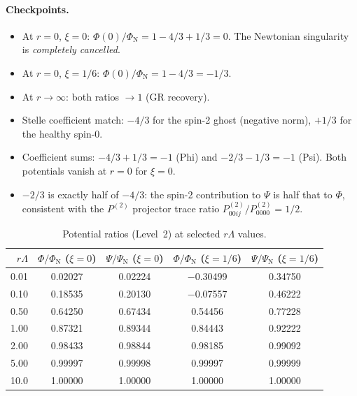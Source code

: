 \documentclass[11pt,a4paper]{article}
\begin{document}
\paragraph{Checkpoints.}
\begin{itemize}
  \item At $r = 0$, $\xi = 0$:
    $\Phi(0)/\Phi_{\mathrm{N}} = 1 - 4/3 + 1/3 = 0$.
    The Newtonian singularity is \emph{completely cancelled}.
    \quad\textcolor{verified}{\checkmark}

  \item At $r = 0$, $\xi = 1/6$:
    $\Phi(0)/\Phi_{\mathrm{N}} = 1 - 4/3 = -1/3$.
    \quad\textcolor{verified}{\checkmark}

  \item At $r \to \infty$: both ratios $\to 1$ (GR recovery).
    \quad\textcolor{verified}{\checkmark}

  \item Stelle coefficient match: $-4/3$ for the spin-2 ghost (negative
    norm), $+1/3$ for the healthy spin-0.
    \quad\textcolor{verified}{\checkmark}

  \item Coefficient sums: $-4/3 + 1/3 = -1$ (Phi) and $-2/3 - 1/3 = -1$
    (Psi).  Both potentials vanish at $r = 0$ for $\xi = 0$.
    \quad\textcolor{verified}{\checkmark}

  \item $-2/3$ is exactly half of $-4/3$: the spin-2 contribution to
    $\Psi$ is half that to $\Phi$, consistent with the $P^{(2)}$ projector
    trace ratio $P^{(2)}_{00ij}/P^{(2)}_{0000} = 1/2$.
    \quad\textcolor{verified}{\checkmark}
\end{itemize}

\begin{table}[h]
\centering
\caption{Potential ratios (Level~2) at selected $r\Lambda$ values.}
\label{tab:potentials}
\begin{tabular}{r c c c c}
\toprule
$r\Lambda$ & $\Phi/\Phi_{\mathrm{N}}$ ($\xi{=}0$)
  & $\Psi/\Psi_{\mathrm{N}}$ ($\xi{=}0$)
  & $\Phi/\Phi_{\mathrm{N}}$ ($\xi{=}1/6$)
  & $\Psi/\Psi_{\mathrm{N}}$ ($\xi{=}1/6$) \\
\midrule
0.01  &  0.02027  &  0.02224  & $-$0.30499 &  0.34750 \\
0.10  &  0.18535  &  0.20130  & $-$0.07557 &  0.46222 \\
0.50  &  0.64250  &  0.67434  &    0.54456 &  0.77228 \\
1.00  &  0.87321  &  0.89344  &    0.84443 &  0.92222 \\
2.00  &  0.98433  &  0.98844  &    0.98185 &  0.99092 \\
5.00  &  0.99997  &  0.99998  &    0.99997 &  0.99999 \\
10.0  &  1.00000  &  1.00000  &    1.00000 &  1.00000 \\
\bottomrule
\end{tabular}
\end{table}
\end{document}
